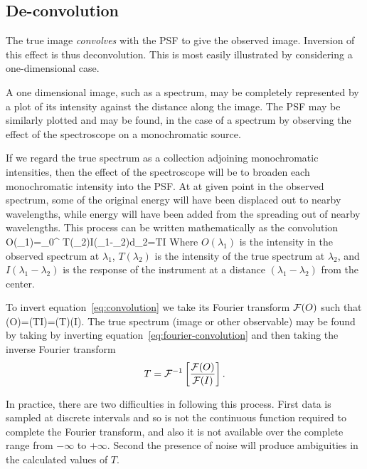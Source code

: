 \subsection{De-convolution}

The true image {\it convolves} with the PSF to give the observed image. Inversion of this effect is thus deconvolution. This is most easily illustrated by considering a one-dimensional case. 

A one dimensional image, such as a spectrum, may be completely represented by a plot of its intensity against the distance along the image. The PSF may be similarly plotted and may be found, in the case of a spectrum by observing the effect of the spectroscope on a monochromatic source. 

If we regard the true spectrum as a collection adjoining monochromatic intensities, then the effect of the spectroscope will be to broaden each monochromatic intensity into the PSF. At at given point in the observed spectrum, some of the original energy will have been displaced out to nearby wavelengths, while energy will have been added from the spreading out of nearby wavelengths. This process can be written mathematically as the convolution
\be
O(\lambda_1)=\int_0^{\infty} T(\lambda_2)I(\lambda_1-\lambda_2)d\lambda_2=T\otimes I
\label{eq:convolution}
\ee
Where $O(\lambda_1)$ is the intensity in the observed spectrum at $\lambda_1$, $T(\lambda_2)$ is the intensity of the true spectrum at $\lambda_2$, and $I(\lambda_1-\lambda_2)$ is the response of the instrument at a distance $(\lambda_1-\lambda_2)$ from the center.

To invert equation~\ref{eq:convolution} we take its Fourier transform ${\cal F}(O)$ such that
\be
{}(O)=(T\otimes I)=(T)\times{}(I).
\label{eq:fourier-convolution}
\ee
The true spectrum (image or other observable) may be found by taking by inverting equation~\ref{eq:fourier-convolution} and then taking the inverse Fourier transform
\[
T={\cal F}^{-1}\left[{{\cal F}(O)\over{\cal F}(I)}\right].
\]

In practice, there are two difficulties in following this process. First data is sampled at discrete intervals and so is not the continuous function required to complete the Fourier transform, and also it is not available over the complete range from $-\infty$ to $+\infty$. Second the presence of noise will produce ambiguities in the calculated values of $T$.

